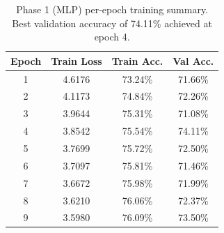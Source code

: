 \begin{table}[H]
\centering
\caption{Phase 1 (MLP) per-epoch training summary.
Best validation accuracy of 74.11\% achieved at epoch 4.}
\label{tab:p1_epoch_log}
\begin{tabular}{cccc}
\toprule
\textbf{Epoch} & \textbf{Train Loss} & \textbf{Train Acc.} & \textbf{Val Acc.} \\
\midrule
1 & 4.6176 & 73.24\% & 71.66\% \\
2 & 4.1173 & 74.84\% & 72.26\% \\
3 & 3.9644 & 75.31\% & 71.08\% \\
4 & 3.8542 & 75.54\% & 74.11\% \\
5 & 3.7699 & 75.72\% & 72.50\% \\
6 & 3.7097 & 75.81\% & 71.46\% \\
7 & 3.6672 & 75.98\% & 71.99\% \\
8 & 3.6210 & 76.06\% & 72.37\% \\
9 & 3.5980 & 76.09\% & 73.50\% \\
\bottomrule
\end{tabular}
\end{table}
